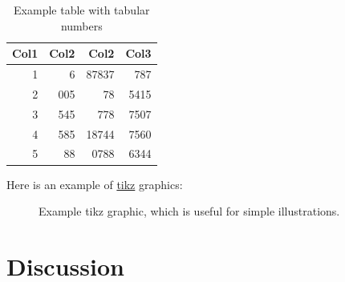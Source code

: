 \documentclass[12pt, a4paper, oneside]{article}
\begin{document}
\begin{table}[h]
    \centering
    \renewcommand{\arraystretch}{1.2}
    \setlength{\tabcolsep}{16pt}
    \caption[Example table]{Example table with tabular numbers}
    \begin{tabular}{rrrr}
        \toprule
        \textbf{Col1} & \textbf{Col2} & \textbf{Col2} & \textbf{Col3} \\
        \midrule
        1             & 6             & 87837         & 787           \\
        2             & 005           & 78            & 5415          \\
        3             & 545           & 778           & 7507          \\
        4             & 585           & 18744         & 7560          \\
        5             & 88            & 0788          & 6344          \\
        \bottomrule
    \end{tabular}
    \label{tab:numbers}
\end{table}

\blindtext

Here is an example of \href{https://www.overleaf.com/learn/latex/TikZ_package}{tikz} graphics: \medskip

\begin{figure}[h]
    \centering
    \label{fig:tikz}
    \caption[tikz graphics]{Example tikz graphic, which is useful for simple illustrations.}
\end{figure}

\clearpage


\section{Discussion} \label{sec:summary}
\end{document}
